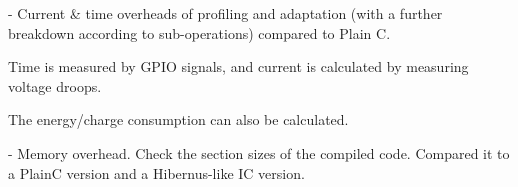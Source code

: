 - Current \& time overheads of profiling and adaptation (with a further breakdown according to sub-operations) compared to Plain C. 

Time is measured by GPIO signals, and current is calculated by measuring voltage droops. 

The energy/charge consumption can also be calculated. 

- Memory overhead. Check the section sizes of the compiled code. Compared it to a PlainC version and a Hibernus-like IC version.  






